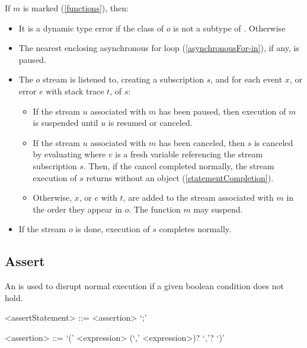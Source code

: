 \documentclass[makeidx]{article}
\begin{document}
\LMHash{}%
If $m$ is marked \code{\ASYNC*} (\ref{functions}), then:
\begin{itemize}
\item
  It is a dynamic type error if the class of $o$
  is not a subtype of .
  Otherwise
\item
  The nearest enclosing asynchronous for loop (\ref{asynchronousFor-in}),
  if any, is paused.
\item
  The $o$ stream is listened to, creating a subscription $s$,
  and for each event $x$, or error $e$ with stack trace $t$, of $s$:
  \begin{itemize}
  \item
    If the stream $u$ associated with $m$ has been paused,
    then execution of $m$ is suspended until $u$ is resumed or canceled.
  \item
    If the stream $u$ associated with $m$ has been canceled,
    then $s$ is canceled by evaluating 
    where $v$ is a fresh variable referencing the stream subscription $s$.
    Then, if the cancel completed normally,
    the stream execution of $s$ returns without an object
    (\ref{statementCompletion}).
  \item
    Otherwise, $x$, or $e$ with $t$, are added to
    the stream associated with $m$ in the order they appear in $o$.
    The function $m$ may suspend.
  \end{itemize}
\item
  If the stream $o$ is done, execution of $s$ completes normally.
\end{itemize}


\subsection{Assert}

\LMHash{}%
An  is used to disrupt normal execution
if a given boolean condition does not hold.

\begin{grammar}
<assertStatement> ::= <assertion> `;'

<assertion> ::= \ASSERT{} `(' <expression> (`,' <expression>)? `,'? `)'
\end{grammar}
\end{document}
